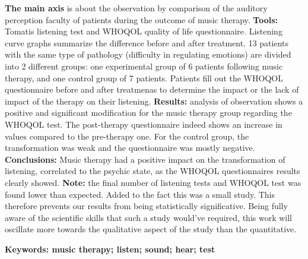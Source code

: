 \textbf {The main axis} is about the observation by comparison of the auditory perception faculty of 
patients during the outcome of music therapy.
\textbf{Tools:} Tomatis listening test and WHOQOL quality of life questionnaire.
Listening curve graphs summarize the difference before and after treatment.
13 patients with the same type of pathology (difficulty in regulating
emotions) are divided into 2 different groups: one experimental group of 6 patients following music 
therapy, and one control group of 7 patients. Patients fill out the WHOQOL questionnaire before and after 
treatmenas to determine the impact or the lack of impact of the therapy on their listening.
\textbf{Results:} analysis of observation shows a positive and significant modification for the music 
therapy group regarding the WHOQOL test. The post-therapy questionnaire indeed shows an increase in 
values compared to the pre-therapy one.
For the control group, the transformation was weak and the questionnaire was mostly negative.
\textbf{Conclusions:} Music therapy had a positive impact on the transformation of listening, correlated 
to the psychic state, as the WHOQOL questionnaires results clearly showed.
\textbf{Note:} the final number of listening tests and WHOQOL test was found lower than expected. 
Added to the fact this was a small study. This therefore prevents our results from being statistically 
significative. 
Being fully aware of the scientific skills that such a study would’ve required, this work will oscillate more 
towards the qualitative aspect of the study than the quantitative.

\textbf{Keywords: music therapy; listen; sound; hear; test}













